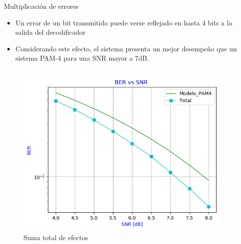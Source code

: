 \documentclass[xcolor=table]{beamer}
\begin{document}
\begin{frame}{Multiplicación de errores}
\begin{itemize}
    \item Un error de un bit transmitido puede verse reflejado en hasta 4 bits a la salida
 del decodificador
 \item Considerando este efecto, el sistema presenta un mejor desempeño que un sistema PAM-4 para una SNR mayor a 7dB.
 \end{itemize}
 
  \vspace{0.5cm}
\begin{columns}
    \begin{column}{0.48\paperwidth}
    \begin{figure}
        \centering
        \includegraphics[width=\textwidth]{Graficos/BER_vs_SNR_4.png}%
        \caption{Suma total de efectos}
        \label{fig:my_label}
    \end{figure}
    
    
    \end{column}
    \begin{column}{0.48\paperwidth}  
    

\end{column}
\end{columns}
\end{frame}
\end{document}

